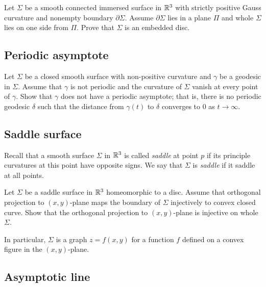 \begin{pr}
Let $\Sigma$ be a smooth connected immersed surface in $\mathbb{R}^3$ with strictly positive Gauss curvature and nonempty boundary $\partial\Sigma$.
Assume $\partial\Sigma$ lies in a plane $\Pi$
and whole $\Sigma$ lies on one side from $\Pi$.
Prove that $\Sigma$ is an embedded disc.
\end{pr}

\subsection*{Periodic asymptote}
\label{Asymptotic geodesic}

\begin{pr}
Let $\Sigma$ be a closed smooth surface with non-positive curvature
and $\gamma$ be a geodesic in $\Sigma$.
Assume that $\gamma$ is not periodic
and the curvature of $\Sigma$ vanish at every point of $\gamma$.
Show that $\gamma$ does not have a periodic asymptote;
that is, there is no periodic geodesic $\delta$ such that the distance from $\gamma(t)$ to $\delta$  converges to $0$ as $t\to\infty$. 
\end{pr}

\subsection*{Saddle surface}
\label{Saddle surface}

Recall that a smooth surface $\Sigma$ in $\mathbb{R}^3$
is called \emph{saddle} at point $p$ if its principle curvatures at this point have opposite signs. 
We say that $\Sigma$ is {}\emph{saddle} if it saddle at all points.

\begin{pr}
Let $\Sigma$ be a saddle surface in $\mathbb{R}^3$
homeomorphic to a disc.
Assume that orthogonal projection to $(x,y)$-plane
maps the boundary of $\Sigma$
injectively to convex closed curve.
Show that the orthogonal projection to $(x,y)$-plane is injective on whole $\Sigma$.

In particular, $\Sigma$ is a graph $z=f(x,y)$ for a function $f$ defined on a convex figure in the $(x,y)$-plane.
\end{pr}


\subsection*{Asymptotic line}
\label{asymptotic-line}

